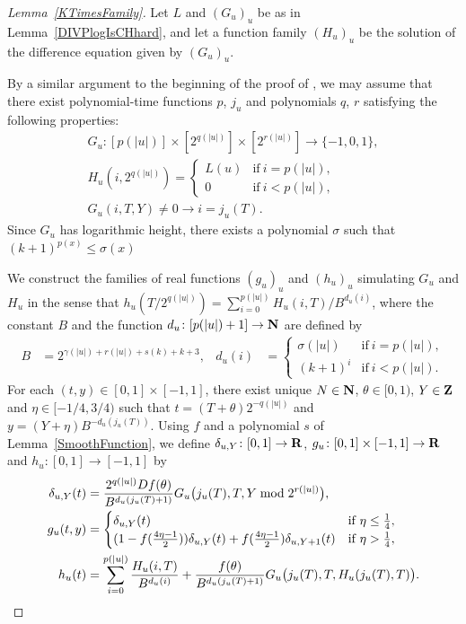 \begin{proof}[Lemma~\ref{KTimesFamily}]
Let $L$ and $(G_u)_u$ be as in Lemma~\ref{DIVPlogIsCHhard},
and let a function family $(H_u)_u$ be the solution of the difference equation given by $(G_u)_u$.

By a similar argument to the beginning of the proof of \cite[Lemma 4.1]{kawamura2010lipschitz},
we may assume that there exist polynomial-time functions $p$, $j_u$
and polynomials $q$, $r$ satisfying the following properties:
\begin{gather}
 G_u \colon [p(|u|)] \times [2^{q(|u|)}] \times [2^{r(|u|)}] \to \{-1, 0, 1\},
 \\
 H_u(i, 2^{q(|u|)}) = \begin{cases}
		       L(u) & \text{if} \ i=p(|u|), \\
		       0 & \text{if} \ i<p(|u|), 
		      \end{cases}
 \\
 G_u(i, T, Y) \neq 0 \to i = j_u(T).
\end{gather}
Since $G_u$ has logarithmic height,
there exists a polynomial $\sigma$ such that $(k+1)^{p(x)} \le \sigma(x)$


We construct the families of real functions $(g_u)_u$ and $(h_u)_u$ simulating $G _u$ and $H _u$ 
in the sense that $h_u(T/2^{q(|u|)}) = \sum^{p(|u|)}_{i = 0}H_u(i, T)/B^{d_u(i)}$, 
where the constant $B$ and the function $d_u \colon [p(|u|)+1] \to \mathbf N$ are 
defined by
  \begin{align}
   B &= 2^{\gamma(|u|) + r(|u|) + s(k) + k + 3}, 
   &
   d_u(i) &= 
   \begin{cases}
    \sigma(|u|) & \text{if} \ i=p(|u|), 
    \\
    (k+1)^i & \text{if} \ i<p(|u|).
   \end{cases}
  \end{align}
For each $(t, y) \in [0,1] \times [-1, 1]$,
there exist unique $N \in \mathbf N$, $\theta \in [0,1)$, $Y \in \mathbf Z$ and $\eta \in [-1/4, 3/4)$
such that $t = (T + \theta)2^{-q(|u|)}$ and $y = (Y + \eta)B^{-d_u(j_u(T))}$.
Using $f$ and a polynomial $s$ of Lemma~\ref{SmoothFunction},
we define 
$\delta_{u,Y} \colon [0,1] \to \mathbf R$,
$
g _u \colon [0, 1] \times [-1, 1] \to \mathbf R
$ and $
h _u \colon [0, 1] \to [-1, 1]
$ by
  \begin{align}
    \label{eq:delta}
   \delta_{u, Y} (t) &= \frac{2^{q(|u|)} D f(\theta)}{B^{d_u(j_u(T)+1)}} 
   G_u \bigl( j_u(T), T, Y \bmod 2^{r(|u|)} \bigr),
   \\
  \label{eq:gu}
  g_u(t,y) 
  &= \begin{cases}
     \delta_{u, Y}(t)
     & \text{if} \ \eta \le \frac 1 4, 
     \\
     ( 1-f ( \frac{4\eta-1}{2})) \delta_{u, Y}(t)
     + f ( \frac{4\eta-1}{2}) \delta_{u,Y+1}(t)
     & \text{if} \ \eta > \frac 1 4,
    \end{cases}
   \\
  h_u(t) 
   &= \sum^{p(|u|)}_{i=0} \frac{H_u(i, T)}{B^{d_u(i)}}  
  + \frac{f(\theta)}{B^{d_u(j_u(T)+1)}} G_u \bigl( j_u(T), T, H_u(j_u(T), T) \bigr) .
  \label{eq:hu}
  \end{align}


\end{proof}
